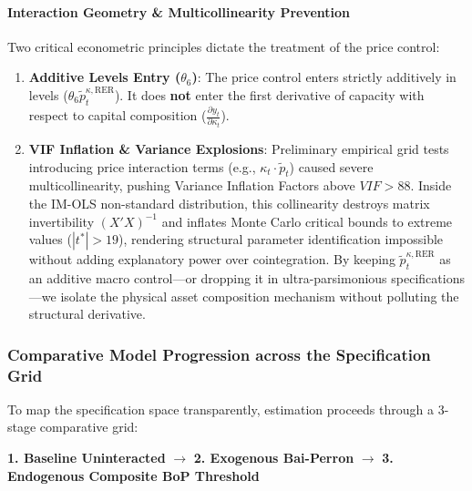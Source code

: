 \paragraph{Interaction Geometry \& Multicollinearity Prevention}
Two critical econometric principles dictate the treatment of the price control:
\begin{enumerate}
    \item \textbf{Additive Levels Entry ($\theta_6$)}: The price control enters strictly additively in levels ($\theta_6 \tilde{p}_t^{\kappa, \text{RER}}$). It does \textbf{not} enter the first derivative of capacity with respect to capital composition ($\frac{\partial y_t}{\partial \kappa_t}$).
    \item \textbf{VIF Inflation \& Variance Explosions}: Preliminary empirical grid tests introducing price interaction terms (e.g., $\kappa_t \cdot \tilde{p}_t$) caused severe multicollinearity, pushing Variance Inflation Factors above $VIF > 88$. Inside the IM-OLS non-standard distribution, this collinearity destroys matrix invertibility $(X'X)^{-1}$ and inflates Monte Carlo critical bounds to extreme values ($|t^*| > 19$), rendering structural parameter identification impossible without adding explanatory power over cointegration. By keeping $\tilde{p}_t^{\kappa, \text{RER}}$ as an additive macro control---or dropping it in ultra-parsimonious specifications---we isolate the physical asset composition mechanism without polluting the structural derivative.
\end{enumerate}

\subsubsection{Comparative Model Progression across the Specification Grid}

To map the specification space transparently, estimation proceeds through a 3-stage comparative grid:

\begin{center}
\textbf{1. Baseline Uninteracted} $\longrightarrow$ \textbf{2. Exogenous Bai-Perron} $\longrightarrow$ \textbf{3. Endogenous Composite BoP Threshold}
\end{center}

